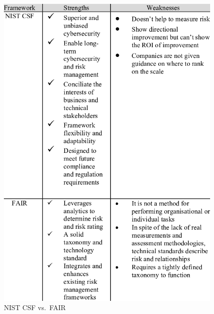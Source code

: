\restoregeometry
\fancyheadoffset{0pt}

\vspace*{\fill}
\begin{figure}[t!]
       \begin{minipage}[c]{0.4\linewidth}
             \centering
             \includegraphics[scale=1.0]{Strengths-and-weaknesses-of-NIST-CSF-and-FAIR.png}
             \caption{NIST CSF vs.\ FAIR}
       \end{minipage}\hfill
       \begin{minipage}[c]{0.4\linewidth}
             \centering

\end{minipage}
\end{figure}
